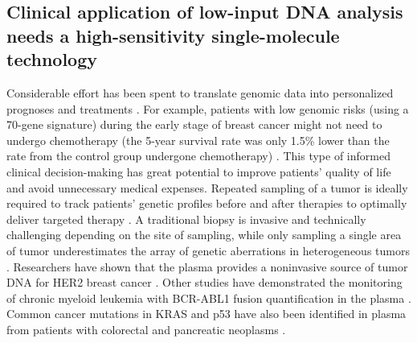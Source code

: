 \subsection{Clinical application of low-input DNA analysis needs a high-sensitivity single-molecule technology}
Considerable effort has been spent to translate genomic data into personalized prognoses and treatments \cite{Cardoso:2016dt,Papaemmanuil:2016jz,Girirajan:2012ks}. For example, patients with low genomic risks (using a 70-gene signature) during the early stage of breast cancer might not need to undergo chemotherapy (the 5-year survival rate was only 1.5\% lower than the rate from the control group undergone chemotherapy) \cite{Cardoso:2016dt}. This type of informed clinical decision-making has great potential to improve patients' quality of life and avoid unnecessary medical expenses. Repeated sampling of a tumor is ideally required to track patients' genetic profiles before and after therapies to optimally deliver targeted therapy \cite{Gevensleben:2013kg}. A traditional biopsy is invasive and technically challenging depending on the site of sampling, while only sampling a single area of tumor underestimates the array of genetic aberrations in heterogeneous tumors \cite{Ding:2010hu}. Researchers have shown that the plasma provides a noninvasive source of tumor DNA for HER2 breast cancer \cite{Gevensleben:2013kg,Cochran:2014cn}. Other studies have demonstrated the monitoring of chronic myeloid leukemia with BCR-ABL1 fusion quantification in the plasma \cite{Jennings:2014et}. Common cancer mutations in KRAS and p53 have also been identified in plasma from patients with colorectal and pancreatic neoplasms \cite{Anker:1997ub,Mulcahy:1998wa}. 

